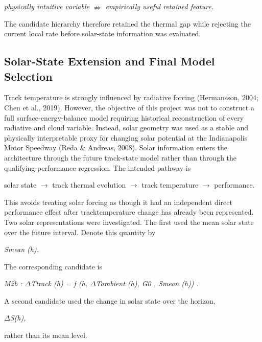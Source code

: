 \begin{center}\textit{physically intuitive variable \ensuremath{\nRightarrow} empirically useful retained feature.}\end{center}

The candidate hierarchy therefore retained the thermal gap while rejecting the current local rate before solar-state information was evaluated.

\subsection{Solar-State Extension and Final Model Selection}
Track temperature is strongly influenced by radiative forcing (Hermansson, 2004; Chen et al., 2019). However, the objective of this project was not to construct a full surface-energy-balance model requiring historical reconstruction of every radiative and cloud variable. Instead, solar geometry was used as a stable and physically interpretable proxy for changing solar potential at the Indianapolis Motor Speedway (Reda \& Andreas, 2008). Solar information enters the architecture through the future track-state model rather than through the qualifying-performance regression. The intended pathway is

solar state \ensuremath{\rightarrow} track thermal evolution \ensuremath{\rightarrow} track temperature \ensuremath{\rightarrow} performance.

This avoids treating solar forcing as though it had an independent direct performance effect after tracktemperature change has already been represented. Two solar representations were investigated. The first used the mean solar state over the future interval. Denote this quantity by

\begin{center}\textit{Smean (h).}\end{center}

The corresponding candidate is

\begin{center}\textit{M2b :     \ensuremath{\Delta}Ttrack (h) = f (h, \ensuremath{\Delta}Tambient (h), G0 , Smean (h)) .}\end{center}

A second candidate used the change in solar state over the horizon,

\begin{center}\textit{\ensuremath{\Delta}S(h),}\end{center}

rather than its mean level.

